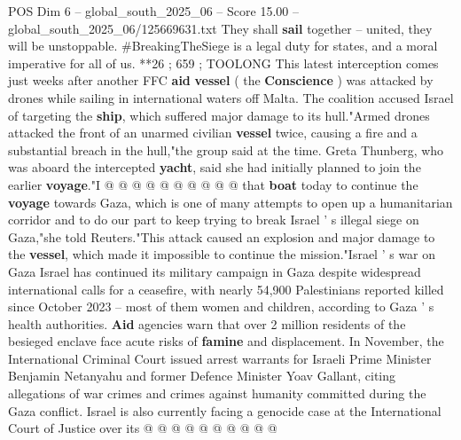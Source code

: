 \begin{textsample}{POS Dim 6 – global\_south\_2025\_06 – Score 15.00 – global\_south\_2025\_06/125669631.txt}
They shall \textbf{sail} together -- united, they will be unstoppable. \#BreakingTheSiege is a legal duty for states, and a moral imperative for all of us. **26 ; 659 ; TOOLONG This latest interception comes just weeks after another FFC \textbf{aid} \textbf{vessel} ( the \textbf{Conscience} ) was attacked by drones while sailing in international waters off Malta.
The coalition accused Israel of targeting the \textbf{ship}, which suffered major damage to its hull."Armed drones attacked the front of an unarmed civilian \textbf{vessel} twice, causing a fire and a substantial breach in the hull,"the group said at the time.
Greta Thunberg, who was aboard the intercepted \textbf{yacht}, said she had initially planned to join the earlier \textbf{voyage}."I @ @ @ @ @ @ @ @ @ @ that \textbf{boat} today to continue the \textbf{voyage} towards Gaza, which is one of many attempts to open up a humanitarian corridor and to do our part to keep trying to break Israel ' s illegal siege on Gaza,"she told Reuters."This attack caused an explosion and major damage to the \textbf{vessel}, which made it impossible to continue the mission."Israel ' s war on Gaza Israel has continued its military campaign in Gaza despite widespread international calls for a ceasefire, with nearly 54,900 Palestinians reported killed since October 2023 -- most of them women and children, according to Gaza ' s health authorities. \textbf{Aid} agencies warn that over 2 million residents of the besieged enclave face acute risks of \textbf{famine} and displacement.
In November, the International Criminal Court issued arrest warrants for Israeli Prime Minister Benjamin Netanyahu and former Defence Minister Yoav Gallant, citing allegations of war crimes and crimes against humanity committed during the Gaza conflict.
Israel is also currently facing a genocide case at the International Court of Justice over its @ @ @ @ @ @ @ @ @ @

\end{textsample}
